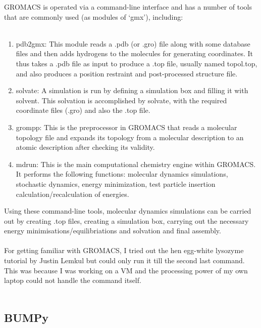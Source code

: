 \documentclass[12pt, a4paper]{report}
\begin{document}
GROMACS is operated via a command-line interface and has a number of tools that are commonly used (as modules of ‘gmx’), including: 
\\~\\ 
\begin{enumerate} 
\item pdb2gmx: This module reads a .pdb (or .gro) file along with some database files and then adds hydrogens to the molecules for generating coordinates. It thus takes a .pdb file as input to produce a .top file, usually named topol.top, and also produces a position restraint and post-processed structure file. 
\item solvate: A simulation is run by defining a simulation box and filling it with solvent. This solvation is accomplished by solvate, with the required coordinate files (.gro) and also the .top file. 
\item grompp: This is the preprocessor in GROMACS that reads a molecular topology file and expands its topology from a molecular description to an atomic description after checking its validity. 
\item mdrun: This is the main computational chemistry engine within GROMACS. It performs the following functions: molecular dynamics simulations, stochastic dynamics, energy minimization, test particle insertion calculation/recalculation of energies. 
\end{enumerate} 

Using these command-line tools, molecular dynamics simulations can be carried out by creating .top files, creating a simulation box, carrying out the necessary energy minimisations/equilibriations and solvation and final assembly. 
\\~\\
For getting familiar with GROMACS, I tried out the hen egg-white lysozyme tutorial by Justin Lemkul but could only run it till the second last command. This was because I was working on a VM and the processing power of my own laptop could not handle the command itself. \\~\\ 


\subsection*{BUMPy} 
\end{document}
